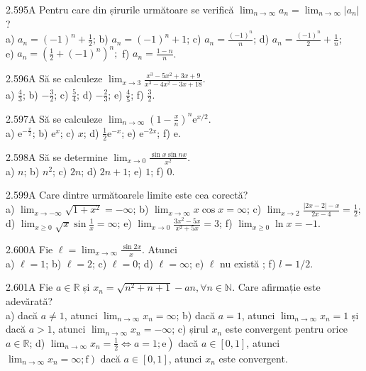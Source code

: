 \documentclass[11pt]{article}
\begin{document}
2.595A Pentru care din șirurile următoare se verifică $\lim _{n \rightarrow \infty} a_{n}=\lim _{n \rightarrow \infty}\left|a_{n}\right|$?\\ a) $a_{n}=(-1)^{n}+\frac{1}{2}$; b) $a_{n}=(-1)^{n}+1$; c) $a_{n}=\frac{(-1)^{n}}{n}$; d) $a_{n}=\frac{(-1)^{n}}{2}+\frac{1}{n}$;\\ e) $a_{n}=\left(\frac{1}{2}+(-1)^{n}\right)^{n} ;$ f) $a_{n}=\frac{1-n}{n}$.

2.596A Să se calculeze $\lim _{x \rightarrow 3} \frac{x^{3}-5 x^{2}+3 x+9}{x^{3}-4 x^{2}-3 x+18}$.\\ a) $\frac{4}{3}$; b) $-\frac{3}{2}$; c) $\frac{5}{4}$; d) $-\frac{2}{3}$; e) $\frac{4}{5}$; f) $\frac{3}{2}$.

2.597A Să se calculeze $\lim _{n \rightarrow \infty}\left(1-\frac{x}{n}\right)^{n} \mathrm{e}^{x / 2}$.\\ a) $\mathrm{e}^{-\frac{x}{2}}$; b) $\mathrm{e}^{x}$; c) $x$; d) $\frac{1}{2} \mathrm{e}^{-x}$; e) $\mathrm{e}^{-2 x}$; f) $\mathrm{e}$.

2.598A Să se determine $\lim _{x \rightarrow 0} \frac{\sin x \sin n x}{x^{2}}$.\\ a) $n$; b) $n^{2}$; c) $2 n$; d) $2 n+1$; e) $1$; f) $0$.

2.599A Care dintre următoarele limite este cea corectă?\\ a) $\lim _{x \rightarrow-\infty} \sqrt{1+x^{2}}=-\infty$; b) $\lim _{x \rightarrow \infty} x \cos x=\infty$; c) $\lim _{x \rightarrow 2} \frac{|2 x-2|-x}{2 x-4}=\frac{1}{2}$; d) $\lim _{x \geq 0} \sqrt{x} \sin \frac{1}{x}=\infty$; e) $\lim _{x \rightarrow 0} \frac{3 x^{2}-5 x}{x^{2}+5 x}=3$; f) $\lim _{x \geq 0} \ln x=-1$.

2.600A Fie $\ell=\lim _{x \rightarrow \infty} \frac{\sin 2 x}{x}$. Atunci\\ a) $\ell=1$; b) $\ell=2$; c) $\ell=0$; d) $\ell=\infty$; e) $\ell$ nu există ; f) $l=1 / 2$.

2.601A Fie $a \in \mathbb{R}$ și $x_{n}=\sqrt{n^{2}+n+1}-a n, \forall n \in \mathbb{N}$. Care afirmație este adevărată?\\ a) dacă $a \neq 1$, atunci $\lim _{n \rightarrow \infty} x_{n}=\infty$; b) dacă $a=1$, atunci $\lim _{n \rightarrow \infty} x_{n}=1$ și dacă $a>1$, atunci $\lim _{n \rightarrow \infty} x_{n}=-\infty$; c) șirul $x_{n}$ este convergent pentru orice $a \in \mathbb{R}$; d) $\left.\lim _{n \rightarrow \infty} x_{n}=\frac{1}{2} \Leftrightarrow a=1 ; \mathrm{e}\right)$ dacă $a \in[0,1]$, atunci $\left.\lim _{n \rightarrow \infty} x_{n}=\infty ; \mathrm{f}\right)$ dacă $a \in[0,1]$, atunci $x_{n}$ este convergent.
\end{document}
